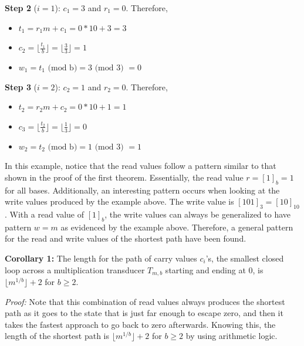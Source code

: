 \documentclass{article}
\begin{document}
\noindent 
\textbf{Step 2} ($i=1$): $c_1 = 3$ and $r_1 = 0$. Therefore,
\begin{itemize}
  \item $t_1 = r_1m + c_1 = 0*10 + 3 = 3$
  \item $c_2 = \lfloor{\frac{t_1}{b}} \rfloor = \lfloor{\frac{3}{3}} \rfloor = 1$
  \item $w_1 = t_1 \text{ (mod b)} = 3 \text{ (mod 3) } = 0$
\end{itemize} \vspace{\baselineskip}

\noindent 
\textbf{Step 3} ($i=2$): $c_2 = 1$ and $r_2 = 0$. Therefore,
\begin{itemize}
  \item $t_2 = r_2m + c_2 = 0*10 + 1 = 1$
  \item $c_3 = \lfloor{\frac{t_2}{b}} \rfloor = \lfloor{\frac{1}{3}} \rfloor = 0$
  \item $w_2 = t_2 \text{ (mod b)} = 1 \text{ (mod 3) } = 1$
\end{itemize} \vspace{\baselineskip}

\noindent
In this example, notice that the read values follow a pattern similar to that shown in the proof of the first theorem. Essentially, the read value $r = [1]_b = 1$ for all bases. Additionally, an interesting pattern occurs when looking at the write values produced by the example above. The write value is $[101]_3 = [10]_{10}$. With a read value of $[1]_b$, the write values can always be generalized to have pattern $w = m$ as evidenced by the example above. Therefore, a general pattern for the read and write values of the shortest path have been found. \vspace{\baselineskip}

\noindent   
\textbf{Corollary 1:} The length for the path of carry values $c_i$'s, the smallest closed loop across a multiplication transducer $T_{m,b}$ starting and ending at $0$, is $\lfloor{m^{1/b}}\rfloor + 2$ for $b \geq 2$. \vspace{\baselineskip}

\noindent
\textit{Proof:} Note that this combination of read values always produces the shortest path as it goes to the state that is just far enough to escape zero, and then it takes the fastest approach to go back to zero afterwards. Knowing this, the length of the shortest path is $\lfloor{m^{1/b}}\rfloor + 2$ for $b \geq 2$ by using arithmetic logic. 

\vspace{\baselineskip}
\end{document}
